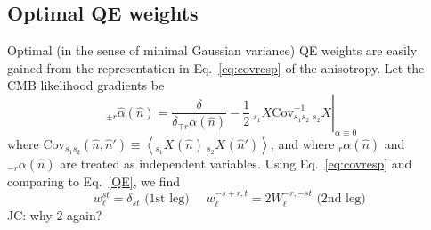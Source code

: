 \documentclass{article}
\newcommand{\Cov}[0]{{\textrm{Cov}}}
\newcommand{\av}[1]{\left\langle #1 \right\rangle}
\newcommand{\JC}[1]{\color{red}JC: #1\color{black}}
\newcommand{\hn}[0]{\hat n}
\begin{document}
\subsection{Optimal QE weights}Optimal (in the sense of minimal Gaussian variance) QE weights are easily gained from the representation in Eq.~\ref{eq:covresp} of the anisotropy. Let the CMB likelihood gradients be
\begin{equation}
	_{\pm r}\hat \alpha(\hn) = \left.\frac{\delta }{\delta _{\mp r}\alpha (\hn)} -\frac 12\: _{s_1}X \Cov^{-1}_{s_1s_2} \:_{s_2}X \right|_{\alpha \equiv 0}
\end{equation}
where $\Cov_{s_1 s_2}(\hn, \hn') \equiv \av{_{s_1}X^{}(\hn) \:_{s_2}X^{}(\hn') }$, and where $_r\alpha(\hn)$ and $_{-r}\alpha(\hn)$ are treated as independent variables. 
Using Eq.~\eqref{eq:covresp} and comparing to Eq.~\eqref{QE}, we find
\begin{equation}\boxed{
	w_\ell^{st} = \delta_{st} \textrm{   (1st leg)  } \quad 	w_\ell^{-s + r, t} = 2W^{-r, -st}_\ell \textrm{   (2nd leg)  }}
\end{equation} \JC{why 2 again? }


\end{document}
